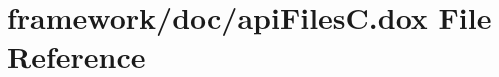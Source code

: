 \hypertarget{api_files_c_8dox}{}\section{framework/doc/api\+FilesC.dox File Reference}
\label{api_files_c_8dox}
